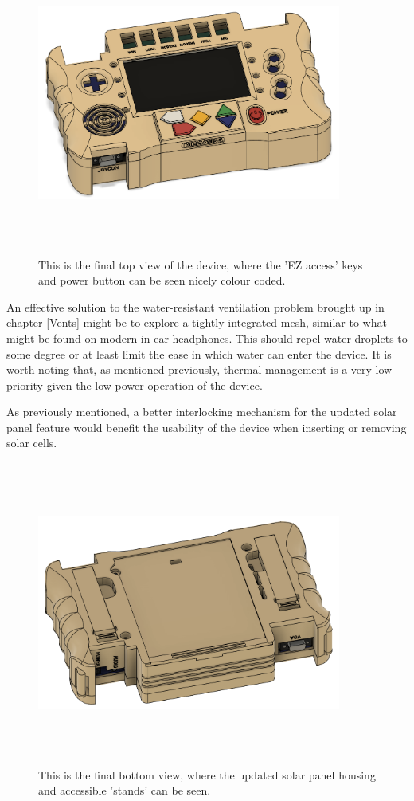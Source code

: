 \begin{figure} [h]
    \centering
    \includegraphics[width=10cm,height=10cm,keepaspectratio]{Figures/final_front_cad.png}
    \caption{This is the final top view of the device, where the 'EZ access' keys and power button can be seen nicely colour coded.}
    \label{fig:FinalTOP}
\end{figure}

An effective solution to the water-resistant ventilation problem brought up in chapter \ref{Vents} might be to explore a tightly integrated mesh, similar to what might be found on modern in-ear headphones.
This should repel water droplets to some degree or at least limit the ease in which water can enter the device.
It is worth noting that, as mentioned previously, thermal management is a very low priority given the low-power operation of the device.

As previously mentioned, a better interlocking mechanism for the updated solar panel feature would benefit the usability of the device when inserting or removing solar cells.

\begin{figure} [h]
    \centering
    \includegraphics[width=10cm,height=10cm,keepaspectratio]{Figures/final_back_cad.png}
    \caption{This is the final bottom view, where the updated solar panel housing and accessible 'stands' can be seen.}
    \label{fig:FinalBOTTOM}
\end{figure}

